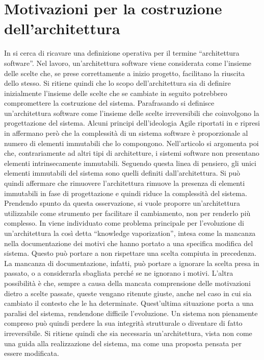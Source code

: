 \documentclass[a4paper,12pt]{report}
\begin{document}
\section{Motivazioni per la costruzione dell'architettura}
In \cite{whoneedsanArchitect} si cerca di ricavare una definizione operativa per il termine ``architettura software''. 
Nel lavoro, un'architettura software viene considerata come l'insieme delle scelte che, se prese correttamente a inizio progetto, facilitano la riuscita dello stesso.
Si ritiene quindi che lo scopo dell'architettura sia di definire inizialmente l'insieme delle scelte che se cambiate in seguito potrebbero compromettere la costruzione del sistema.
Parafrasando si definisce un'architettura software come l'insieme delle scelte irreversibili che coinvolgono la progettazione del sistema.
Alcuni principi dell'ideologia Agile riportati in \cite{martin_fowler_xp_2002} e ripresi in \cite{whoneedsanArchitect} affermano però che la complessità di un sistema software è proporzionale al numero di elementi immutabili che lo compongono.
Nell'articolo si argomenta poi che, contrariamente ad altri tipi di architetture, i sistemi software non presentano elementi intrinsecamente immutabili. 
Seguendo questa linea di pensiero, gli unici elementi immutabili del sistema sono quelli definiti dall'architettura.
Si può quindi affermare che rimuovere l'architettura rimuove la presenza di elementi immutabili in fase di progettazione e quindi riduce la complessità del sistema.
Prendendo spunto da questa osservazione, si vuole proporre un'architettura utilizzabile come strumento per facilitare il cambiamento, non per renderlo più complesso. 
In \cite{designChoiche} viene individuato come problema principale per l'evoluzione di un'architettura la così detta ``knowledge vaporization'', intesa come la mancanza nella documentazione dei motivi che hanno portato a una specifica modifica del sistema. 
Questo può portare a non rispettare una scelta compiuta in precedenza. 
La mancanza di documentazione, infatti, può portare a ignorare la scelta presa in passato, o a considerarla sbagliata perché se ne ignorano i motivi.  
L'altra possibilità è che, sempre a causa della mancata comprensione delle motivazioni dietro a scelte passate, queste vengano ritenute giuste, anche nel caso in cui sia cambiato il contesto che le ha determinate.
Quest'ultima situazione porta a una paralisi del sistema, rendendone difficile l'evoluzione.
Un sistema non pienamente compreso può quindi perdere la sua integrità strutturale o diventare di fatto irreversibile.
Si ritiene quindi che sia necessaria un'architettura, vista non come una guida alla realizzazione del sistema, ma come una proposta pensata per essere modificata. 
\end{document}
